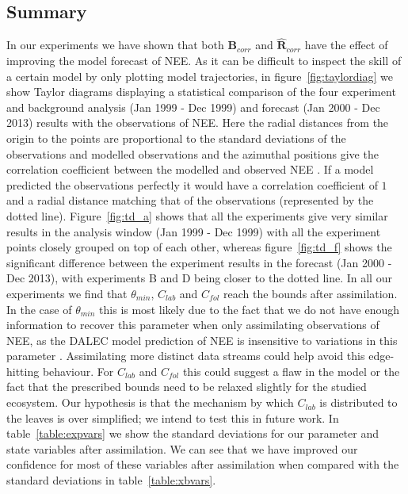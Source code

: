 \documentclass[review]{elsarticle}
\begin{document}
\subsection{Summary}

In our experiments we have shown that both $\textbf{B}_{corr}$ and $\hat{\textbf{R}}_{corr}$ have the effect of improving the model forecast of NEE. As it can be difficult to inspect the skill of a certain model by only plotting model trajectories, in figure~\ref{fig:taylordiag} we show Taylor diagrams displaying a statistical comparison of the four experiment and background analysis (Jan 1999 - Dec 1999) and forecast (Jan 2000 - Dec 2013) results with the observations of NEE. Here the radial distances from the origin to the points are proportional to the standard deviations of the observations and modelled observations and the azimuthal positions give the correlation coefficient between the modelled and observed NEE \citep{Taylor2001}. If a model predicted the observations perfectly it would have a correlation coefficient of $1$ and a radial distance matching that of the observations (represented by the dotted line). Figure~\ref{fig:td_a} shows that all the experiments give very similar results in the analysis window (Jan 1999 - Dec 1999) with all the experiment points closely grouped on top of each other, whereas figure~\ref{fig:td_f} shows the significant difference between the experiment results in the forecast (Jan 2000 - Dec 2013), with experiments B and D being closer to the dotted line. In all our experiments we find that $\theta_{min}$, $C_{lab}$ and $C_{fol}$ reach the bounds after assimilation. In the case of $\theta_{min}$ this is most likely due to the fact that we do not have enough information to recover this parameter when only assimilating observations of NEE, as the DALEC model prediction of NEE is insensitive to variations in this parameter \citep{Ann2013}. Assimilating more distinct data streams could help avoid this edge-hitting behaviour. For $C_{lab}$ and $C_{fol}$ this could suggest a flaw in the model or the fact that the prescribed bounds need to be relaxed slightly for the studied ecosystem. Our hypothesis is that the mechanism by which $C_{lab}$ is distributed to the leaves is over simplified; we intend to test this in future work. In table~\ref{table:expvars} we show the standard deviations for our parameter and state variables after assimilation. We can see that we have improved our confidence for most of these variables after assimilation when compared with the standard deviations in table~\ref{table:xbvars}.
\end{document}
